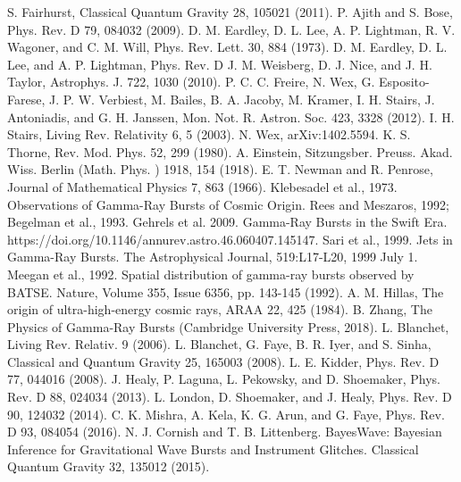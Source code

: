 \documentclass[binding=0.6cm, LaM]{sapthesis}
\begin{document}
\begin{thebibliography}{500}
 	 S. Fairhurst, Classical Quantum Gravity 28, 105021 (2011). 
 	 P. Ajith and S. Bose, Phys. Rev. D 79, 084032 (2009). 
 	 D. M. Eardley, D. L. Lee, A. P. Lightman, R. V. Wagoner, and C. M. Will, Phys. Rev. Lett. 30, 884 (1973). 
 	 D. M. Eardley, D. L. Lee, and A. P. Lightman, Phys. Rev. D 
 	 J. M. Weisberg, D. J. Nice, and J. H. Taylor, Astrophys. J. 722, 1030 (2010).
 	 P. C. C. Freire, N. Wex, G. Esposito-Farese, J. P. W. Verbiest, M. Bailes, B. A. Jacoby, M. Kramer, I. H. Stairs, J. Antoniadis, and G. H. Janssen, Mon. Not. R. Astron. Soc. 423, 3328 (2012).
 	 I. H. Stairs, Living Rev. Relativity 6, 5 (2003).
 	 N. Wex, arXiv:1402.5594.
	 K. S. Thorne, Rev. Mod. Phys. 52, 299 (1980).
         A. Einstein, Sitzungsber. Preuss. Akad. Wiss. Berlin (Math. Phys. ) 1918, 154 (1918).
         E. T. Newman and R. Penrose, Journal of Mathematical Physics 7, 863 (1966).
	 Klebesadel et al., 1973. Observations of Gamma-Ray Bursts of Cosmic Origin.
	 Rees and Meszaros, 1992; Begelman et al., 1993.
	 Gehrels et al. 2009. Gamma-Ray Bursts in the Swift Era. https://doi.org/10.1146/annurev.astro.46.060407.145147.
	 Sari et al., 1999. Jets in Gamma-Ray Bursts. The Astrophysical Journal, 519:L17-L20, 1999 July 1.
	 Meegan et al., 1992. Spatial distribution of gamma-ray bursts observed by BATSE. Nature, Volume 355, Issue 6356, pp. 143-145 (1992).
	 A. M. Hillas, The origin of ultra-high-energy cosmic rays, ARAA 22, 425 (1984).
	 B. Zhang, The Physics of Gamma-Ray Bursts (Cambridge University Press, 2018).
	 L. Blanchet, Living Rev. Relativ. 9 (2006). 
	 L. Blanchet, G. Faye, B. R. Iyer, and S. Sinha, Classical and Quantum Gravity 25, 165003 (2008). 
	 L. E. Kidder, Phys. Rev. D 77, 044016 (2008). 
	 J. Healy, P. Laguna, L. Pekowsky, and D. Shoemaker, Phys. Rev. D 88, 024034 (2013). 
	 L. London, D. Shoemaker, and J. Healy, Phys. Rev. D 90, 124032 (2014). 
	 C. K. Mishra, A. Kela, K. G. Arun, and G. Faye, Phys. Rev. D 93, 084054 (2016).
	 N. J. Cornish and T. B. Littenberg. BayesWave: Bayesian Inference for Gravitational Wave Bursts and Instrument Glitches. Classical Quantum Gravity 32, 135012 (2015). 

\end{thebibliography}
\end{document}
